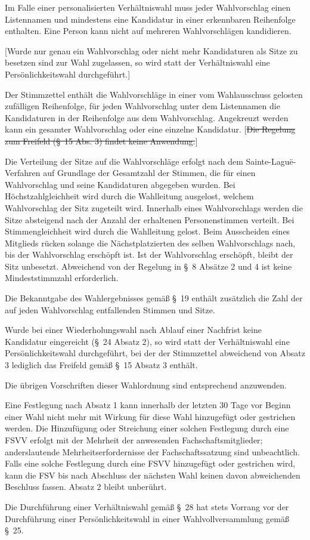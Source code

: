 \documentclass[%
draft,%
multilinesections%
]{fswo}
\newcommand\oldT[1]  {{\color{Gray}[\st{#1}]}}
\newcommand\newT[1]  {{\color{Green}[#1]}}
\newcommand\oldT[1]{}%
\newcommand\newT[1]{#1}
\begin{document}
\begin{contract}
Im Falle einer personalisierten Verhältniswahl muss jeder Wahlvorschlag einen Listennamen und mindestens eine Kandidatur in einer erkennbaren Reihenfolge enthalten.
Eine Person kann nicht auf mehreren Wahlvorschlägen kandidieren.

\newT{Wurde nur genau ein Wahlvorschlag oder nicht mehr Kandidaturen als Sitze zu besetzen sind zur Wahl zugelassen, so wird statt der Verhältniswahl eine Persönlichkeitswahl durchgeführt.}

Der Stimmzettel enthält die Wahlvorschläge in einer vom Wahlausschuss gelosten zufälligen Reihenfolge, für jeden Wahlvorschlag unter dem Listennamen die Kandidaturen in der Reihenfolge aus dem Wahlvorschlag.
Angekreuzt werden kann ein gesamter Wahlvorschlag oder eine einzelne Kandidatur.
\oldT{Die Regelung zum Freifeld (\S~15 Abs. 3) findet keine Anwendung.}

Die Verteilung der Sitze auf die Wahlvorschläge erfolgt nach dem Sainte-Laguë-Verfahren auf Grundlage der Gesamtzahl der Stimmen, die für einen Wahlvorschlag und seine Kandidaturen abgegeben wurden.
Bei Höchstzahlgleichheit wird durch die Wahlleitung ausgelost, welchem Wahlvorschlag der Sitz zugeteilt wird.
Innerhalb eines Wahlvorschlags werden die Sitze absteigend nach der Anzahl der erhaltenen Personenstimmen verteilt.
Bei Stimmengleichheit wird durch die Wahlleitung gelost.
Beim Ausscheiden eines Mitglieds rücken solange die Nächstplatzierten des selben Wahlvorschlags nach, bis der Wahlvorschlag erschöpft ist.
Ist der Wahlvorschlag erschöpft, bleibt der Sitz unbesetzt.
Abweichend von der Regelung in \S~8 Absätze 2 und 4 ist keine Mindeststimmzahl erforderlich.

Die Bekanntgabe des Wahlergebnisses gemäß \S~19 enthält zusätzlich die Zahl der auf jeden Wahlvorschlag entfallenden Stimmen und Sitze.

Wurde bei einer Wiederholungswahl nach Ablauf einer Nachfrist keine Kandidatur eingereicht (\S~24 Absatz 2), so wird statt der Verhältniswahl eine Persönlichkeitswahl durchgeführt, bei der der Stimmzettel abweichend von Absatz 3 lediglich das Freifeld gemäß \S~15 Absatz 3 enthält.

Die übrigen Vorschriften dieser Wahlordnung sind entsprechend anzuwenden.

Eine Festlegung nach Absatz 1 kann innerhalb der letzten 30 Tage vor Beginn einer Wahl nicht mehr mit Wirkung für diese Wahl hinzugefügt oder gestrichen werden.
Die Hinzufügung oder Streichung einer solchen Festlegung durch eine FSVV erfolgt mit der Mehrheit der anwesenden Fachschaftsmitglieder; anderslautende Mehrheitserfordernisse der Fachschaftssatzung sind unbeachtlich.
Falls eine solche Festlegung durch eine FSVV hinzugefügt oder gestrichen wird, kann die FSV bis nach Abschluss der nächsten Wahl keinen davon abweichenden Beschluss fassen.
Absatz 2 bleibt unberührt.

Die Durchführung einer Verhältniswahl gemäß \S~28 hat stets Vorrang vor der Durchführung einer Persönlichkeitswahl in einer Wahlvollversammlung gemäß \S~25.
\end{contract}
\end{document}
